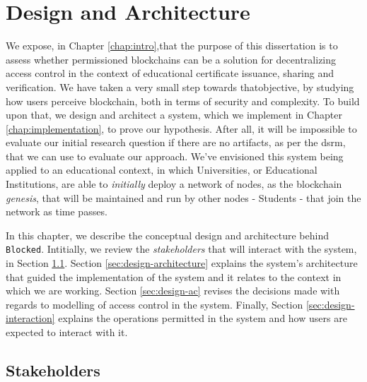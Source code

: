 \chapter{Design and Architecture}
\label{chap:design}

We expose, in Chapter \ref{chap:intro},that the purpose of this dissertation is to assess whether permissioned blockchains can be a solution for decentralizing access control in the context of educational certificate issuance, sharing and verification. We have taken a very small step towards thatobjective, by studying how users perceive blockchain, both in terms of security and complexity. To build upon that, we design and architect a system, which we implement in Chapter \ref{chap:implementation}, to prove our hypothesis. After all, it will be impossible to evaluate our initial research question if there are no artifacts, as per the \gls{dsrm}, that we can use to evaluate our approach. We've envisioned this system being applied to an educational context, in which Universities, or Educational Institutions, are able to \textit{initially} deploy a network of nodes, as the blockchain \textit{genesis}, that will be maintained and run by other nodes - Students - that join the network as time passes.

In this chapter, we describe the conceptual design and architecture behind \texttt{Blocked}. Intitially, we review the \textit{stakeholders} that will interact with the system, in Section \ref{sec:design-entities}. Section \ref{sec:design-architecture} explains the system's architecture that guided the implementation of the system and it relates to the context in which we are working. Section \ref{sec:design-ac} revises the decisions made with regards to modelling of access control in the system. Finally, Section \ref{sec:design-interaction} explains the operations permitted in the system and how users are expected to interact with it.

\section{Stakeholders}
\label{sec:design-entities}

